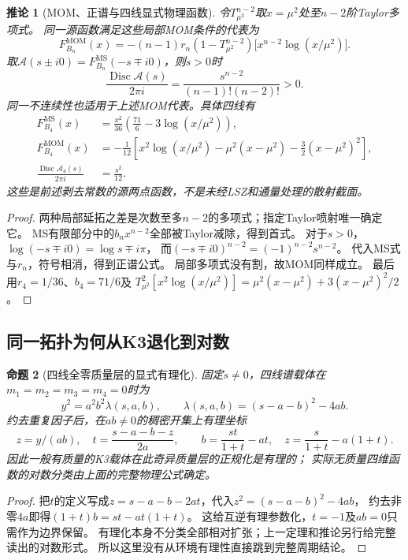 \documentclass[11pt,a4paper]{ctexart}
\theoremstyle{cnplain}\newtheorem{theorem}{定理}[section]
\newtheorem{proposition}[theorem]{命题}
\newtheorem{corollary}[theorem]{推论}
\theoremstyle{definition}\newtheorem{definition}[theorem]{定义}
\theoremstyle{remark}\newtheorem{remark}[theorem]{注}
\begin{document}
\begin{corollary}[MOM、正谱与四线显式物理函数]\label{cor:masslessphysical}
令$T_{\mu^2}^{n-2}$取$x=\mu^2$处至$n-2$阶Taylor多项式。
同一源函数满足这些局部MOM条件的代表为
\[
 F^{\mathrm{MOM}}_{B_n}(x)
 =-(n-1)r_n(1-T_{\mu^2}^{n-2})
       \bigl[x^{n-2}\log(x/\mu^2)\bigr].
\]
取$\mathcal A(s\pm i0)=F_{B_n}^{\mathrm{MS}}(-s\mp i0)$，则$s>0$时
\[
 \frac{\operatorname{Disc}\mathcal A(s)}{2\pi i}
 =\frac{s^{n-2}}{(n-1)!(n-2)!}>0.
 \label{eq:masslessspectral}
\]
同一不连续性也适用于上述MOM代表。具体四线有
\begin{align}
 F^{\mathrm{MS}}_{B_4}(x)&=\frac{x^2}{36}
                   \left(\frac{71}{6}-3\log(x/\mu^2)\right),\\
 F^{\mathrm{MOM}}_{B_4}(x)&=-\frac1{12}\left[
 x^2\log(x/\mu^2)-\mu^2(x-\mu^2)-\frac32(x-\mu^2)^2\right],\\
 \frac{\operatorname{Disc}\mathcal A_4(s)}{2\pi i}&=\frac{s^2}{12}.
\end{align}
这些是前述剥去常数的源两点函数，不是未经LSZ和通量处理的散射截面。
\end{corollary}
\begin{proof}
两种局部延拓之差是次数至多$n-2$的多项式；指定Taylor喷射唯一确定它。
MS有限部分中的$b_nx^{n-2}$全部被Taylor减除，得到首式。
对于$s>0$，$\log(-s\mp i0)=\log s\mp i\pi$，
而$(-s\mp i0)^{n-2}=(-1)^{n-2}s^{n-2}$。
代入MS式与$r_n$，符号相消，得到正谱公式。
局部多项式没有割，故MOM同样成立。
最后用$r_4=1/36$、$b_4=71/6$及
$T_{\mu^2}^{2}[x^2\log(x/\mu^2)]=\mu^2(x-\mu^2)+3(x-\mu^2)^2/2$。
\end{proof}

\subsection{同一拓扑为何从K3退化到对数}
\begin{proposition}[四线全零质量层的显式有理化]\label{prop:masslessdegeneration}
固定$s\ne0$，四线谱载体在$m_1=m_2=m_3=m_4=0$时为
\[
 y^2=a^2b^2\lambda(s,a,b),\qquad
 \lambda(s,a,b)=(s-a-b)^2-4ab.
\]
约去重复因子后，在$ab\ne0$的稠密开集上有理坐标
\[
 z=y/(ab),\quad t=\frac{s-a-b-z}{2a},\qquad
 b=\frac{st}{1+t}-at,\quad z=\frac{s}{1+t}-a(1+t).
\]
因此一般有质量的K3载体在此奇异质量层的正规化是有理的；
实际无质量四维函数的对数分类由上面的完整物理公式确定。
\end{proposition}
\begin{proof}
把$t$的定义写成$z=s-a-b-2at$，代入$z^2=(s-a-b)^2-4ab$，
约去非零$4a$即得$(1+t)b=st-at(1+t)$。
这给互逆有理参数化，$t=-1$及$a b=0$只需作为边界保留。
有理化本身不分类全部相对扩张；上一定理和推论另行给完整读出的对数形式。
所以这里没有从环境有理性直接跳到完整周期结论。
\end{proof}
\end{document}
